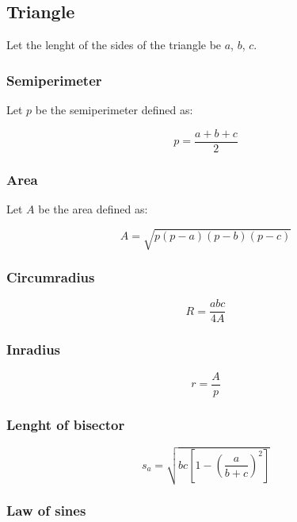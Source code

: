 
\subsection{Triangle}

Let the lenght of the sides of the triangle be $a$, $b$, $c$.

\subsubsection{Semiperimeter}

Let $p$ be the semiperimeter defined as: 

\begin{equation}
  p = \frac{a + b + c}{2}
\end{equation}

\subsubsection{Area}

Let $A$ be the area defined as:

\begin{equation}
  A = \sqrt{p(p-a)(p-b)(p-c)}
\end{equation}

\subsubsection{Circumradius}

\begin{equation}
  R = \frac{abc}{4A}
\end{equation}

\subsubsection{Inradius}

\begin{equation}
  r = \frac{A}{p}
\end{equation}

\subsubsection{Lenght of bisector}

\begin{equation}
s_a=\sqrt{bc\left[1-\left(\dfrac{a}{b+c}\right)^2\right]}
\end{equation}

\subsubsection{Law of sines}

